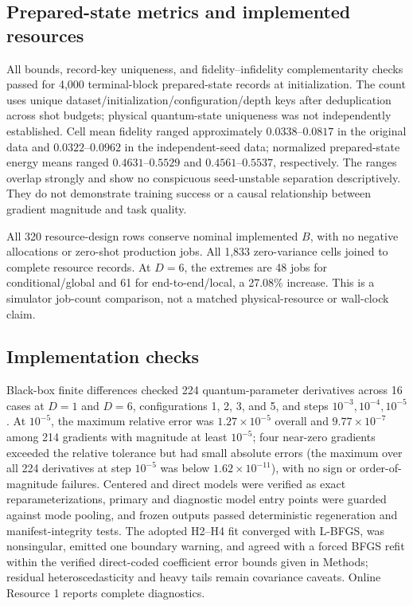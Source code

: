 \documentclass[pdflatex,sn-mathphys-num,Numbered]{sn-jnl}
\begin{document}
\subsection{Prepared-state metrics and implemented resources}

All bounds, record-key uniqueness, and fidelity--infidelity complementarity checks passed for 4,000 terminal-block prepared-state records at initialization. The count uses unique dataset/initialization/configuration/depth keys after deduplication across shot budgets; physical quantum-state uniqueness was not independently established. Cell mean fidelity ranged approximately $0.0338$--$0.0817$ in the original data and $0.0322$--$0.0962$ in the independent-seed data; normalized prepared-state energy means ranged $0.4631$--$0.5529$ and $0.4561$--$0.5537$, respectively. The ranges overlap strongly and show no conspicuous seed-unstable separation descriptively. They do not demonstrate training success or a causal relationship between gradient magnitude and task quality.

All 320 resource-design rows conserve nominal implemented $B$, with no negative allocations or zero-shot production jobs. All 1,833 zero-variance cells joined to complete resource records. At $D=6$, the extremes are 48 jobs for conditional/global and 61 for end-to-end/local, a 27.08\% increase. This is a simulator job-count comparison, not a matched physical-resource or wall-clock claim.

\subsection{Implementation checks}\label{sec:results-robustness}

Black-box finite differences checked 224 quantum-parameter derivatives across 16 cases at $D=1$ and $D=6$, configurations 1, 2, 3, and 5, and steps $10^{-3},10^{-4},10^{-5}$. At $10^{-5}$, the maximum relative error was $1.27\times10^{-5}$ overall and $9.77\times10^{-7}$ among 214 gradients with magnitude at least $10^{-5}$; four near-zero gradients exceeded the relative tolerance but had small absolute errors (the maximum over all 224 derivatives at step $10^{-5}$ was below $1.62\times10^{-11}$), with no sign or order-of-magnitude failures. Centered and direct models were verified as exact reparameterizations, primary and diagnostic model entry points were guarded against mode pooling, and frozen outputs passed deterministic regeneration and manifest-integrity tests. The adopted H2--H4 fit converged with L-BFGS, was nonsingular, emitted one boundary warning, and agreed with a forced BFGS refit within the verified direct-coded coefficient error bounds given in Methods; residual heteroscedasticity and heavy tails remain covariance caveats. Online Resource 1 reports complete diagnostics.
\end{document}
